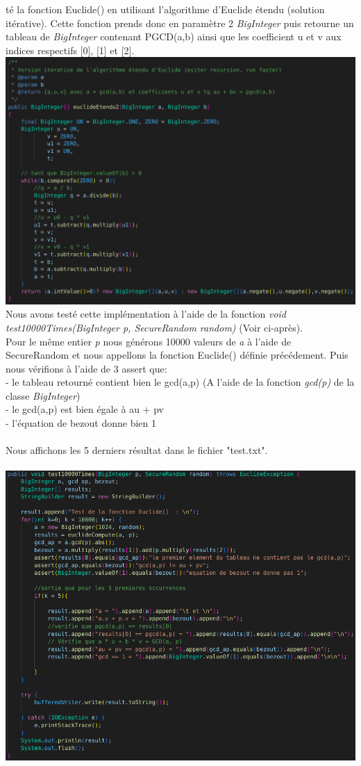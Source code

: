 \documentclass[a4paper,11pt]{article}
\begin{document}
té la fonction Euclide() en utilisant l'algorithme d'Euclide étendu (solution itérative). Cette fonction prends donc en paramètre 2 \textit{BigInteger} puis retourne un tableau de \textit{BigInteger} contenant PGCD(a,b) ainsi que les coefficient u et v aux indices respectifs [0], [1] et [2].\\\includegraphics[scale=0.4]{assets/euclide.png}\\Nous avons testé cette implémentation à l'aide de la fonction \textit{ void test10000Times(BigInteger p, SecureRandom random) } (Voir ci-après).\\Pour le même entier \textit{p} nous générons 10000 valeurs de \textit{a} à l'aide de SecureRandom et nous appellons la fonction Euclide() définie précédement. Puis nous vérifions à l'aide de 3 assert que:\\ - le tableau retourné contient bien le gcd(a,p) (A l'aide de la fonction \textit{gcd(p)} de la classe \textit{BigInteger})\\ - le gcd(a,p) est bien égale à au + pv\\ - l'équation de bezout donne bien 1\\\\ Nous affichons les 5 derniers résultat dans le fichier "test.txt". \\\\\includegraphics[scale=0.3]{assets/testEucl.png}
\end{document}
